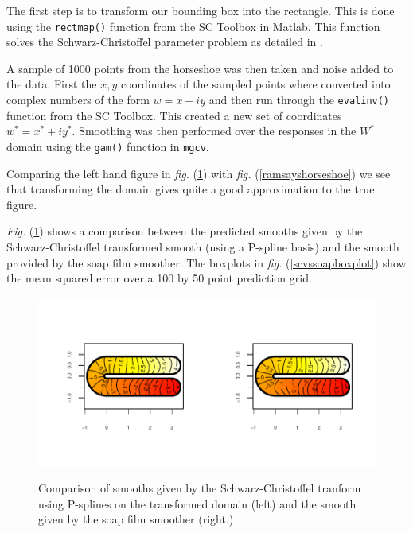\documentclass[a4paper,10pt]{amsart}
\newcommand{\sch}{Schwarz-Christoffel }
\newcommand{\fig}[1]{\emph{fig.} (\ref{#1})}
\newcommand{\Fig}[1]{\emph{Fig.} (\ref{#1})}
\begin{document}
The first step is to transform our bounding box into the rectangle. This is done using the \texttt{rectmap()} function from the SC Toolbox in Matlab. This function solves the \sch parameter problem as detailed in \cite{miller08}.

A sample of 1000 points from the horseshoe was then taken and noise added to the data. First the $x,y$ coordinates of the sampled points where converted into complex numbers of the form $w=x+iy$ and then run through the \texttt{evalinv()} function from the SC Toolbox. This created a new set of coordinates $w^*=x^*+iy^*$. Smoothing was then performed over the responses in the $W^*$ domain using the \texttt{gam()} function in \texttt{mgcv}. 

Comparing the left hand figure in \fig{compsmooth} with \fig{ramsayshorseshoe} we see that transforming the domain gives quite a good approximation to the true figure.

\Fig{compsmooth} shows a comparison between the predicted smooths given by the \sch transformed smooth (using a P-spline basis) and the smooth provided by the soap film smoother. The boxplots in \fig{scvssoapboxplot} show the mean squared error over a 100 by 50 point prediction grid.

\begin{figure}
\centering
\includegraphics[trim=0.5in 0.5in 0in 0in]{figs/compsmooth.pdf} \\
\caption{Comparison of smooths given by the \sch tranform using P-splines on the transformed domain (left) and the smooth given by the soap film smoother (right.)}
\label{compsmooth}
\end{figure}
\end{document}
